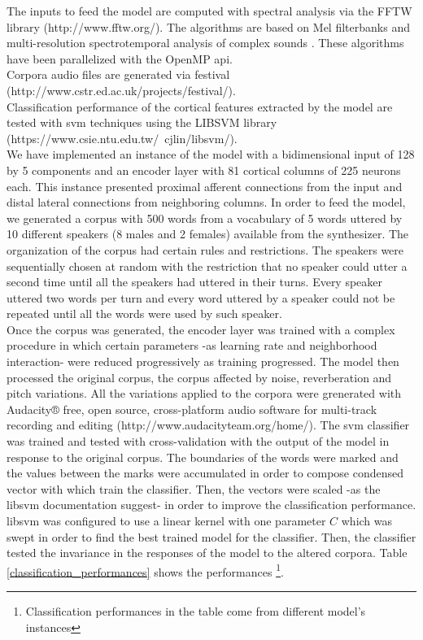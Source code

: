 \documentclass[11pt,a4paper]{article}
\begin{document}
The inputs to feed the model are computed
with spectral analysis via the FFTW library (http://www.fftw.org/).
The algorithms are based on 
Mel filterbanks and multi-resolution
spectrotemporal analysis of complex sounds \cite{taishih_2005}.
These algorithms have been parallelized with the OpenMP \gls{api}. \\

Corpora audio files are generated via \gls{festival} \\ (http://www.cstr.ed.ac.uk/projects/festival/). \\

Classification performance of the cortical features extracted by the model are tested with
\gls{svm} techniques using the LIBSVM library (https://www.csie.ntu.edu.tw/~cjlin/libsvm/). \\

We have implemented an instance of the model with a bidimensional input
of 128 by 5 components and an encoder layer
with 81 cortical columns of 225 neurons each.
This instance presented proximal afferent connections
from the input and distal lateral connections from
neighboring columns.
In order to feed the model, we generated a corpus with 500 words from a vocabulary of
5 words uttered by 10 different speakers (8 males and 2 females) available from the synthesizer.
The organization of the corpus had certain rules and restrictions.
The speakers were sequentially chosen at random with the restriction that no speaker could
utter a second time until all the speakers had uttered in their turns.
Every speaker uttered two words per turn and every word uttered by a speaker
could not be repeated until all the words were used by such speaker. \\

Once the corpus was generated, the encoder layer was trained with a complex procedure
in which certain parameters -as learning rate and neighborhood interaction- were
reduced progressively as training progressed. 
The model then processed the original corpus, the corpus affected by noise,
reverberation and pitch variations.
All the variations applied to the corpora were grenerated with
Audacity® free, open source, cross-platform audio software for
multi-track recording and editing
(http://www.audacityteam.org/home/).
The \gls{svm} classifier was trained and tested with cross-validation
with the output of the model in response to the original corpus.
The boundaries of the words were marked and the values between the marks
were accumulated in order to compose condensed vector with which train
the classifier. Then, the vectors were scaled -as the \gls{libsvm} documentation suggest-
in order to improve the classification performance.
\gls{libsvm} was configured to use a linear kernel with one parameter $C$ which
was swept in order to find the best trained model for the classifier.
Then, the classifier tested the invariance in the responses of the model
to the altered corpora.
Table \ref{classification_performances} shows the performances
\footnote{Classification performances in the table come from different model's instances}. \\
\end{document}
